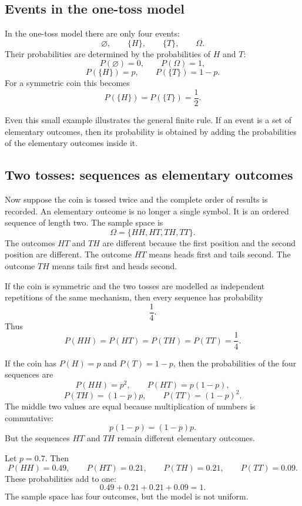 \subsection*{Events in the one-toss model}

In the one-toss model there are only four events:
\[
\varnothing,\qquad \{H\},\qquad \{T\},\qquad \Omega.
\]
Their probabilities are determined by the probabilities of \(H\) and \(T\):
\[
P(\varnothing)=0,\qquad P(\Omega)=1,
\]
\[
P(\{H\})=p,\qquad P(\{T\})=1-p.
\]
For a symmetric coin this becomes
\[
P(\{H\})=P(\{T\})=\frac12.
\]

Even this small example illustrates the general finite rule. If an event is a
set of elementary outcomes, then its probability is obtained by adding the
probabilities of the elementary outcomes inside it.

\subsection*{Two tosses: sequences as elementary outcomes}

Now suppose the coin is tossed twice and the complete order of results is
recorded. An elementary outcome is no longer a single symbol. It is an ordered
sequence of length two. The sample space is
\[
\Omega=\{HH,HT,TH,TT\}.
\]
The outcomes \(HT\) and \(TH\) are different because the first position and the
second position are different. The outcome \(HT\) means heads first and tails
second. The outcome \(TH\) means tails first and heads second.

If the coin is symmetric and the two tosses are modelled as independent
repetitions of the same mechanism, then every sequence has probability
\[
\frac14.
\]
Thus
\[
P(HH)=P(HT)=P(TH)=P(TT)=\frac14.
\]

If the coin has \(P(H)=p\) and \(P(T)=1-p\), then the probabilities of the four
sequences are
\[
P(HH)=p^2,\qquad P(HT)=p(1-p),
\]
\[
P(TH)=(1-p)p,\qquad P(TT)=(1-p)^2.
\]
The middle two values are equal because multiplication of numbers is
commutative:
\[
p(1-p)=(1-p)p.
\]
But the sequences \(HT\) and \(TH\) remain different elementary outcomes.

\begin{examplebox}
Let \(p=0.7\). Then
\[
P(HH)=0.49,\qquad P(HT)=0.21,\qquad P(TH)=0.21,\qquad P(TT)=0.09.
\]
These probabilities add to one:
\[
0.49+0.21+0.21+0.09=1.
\]
The sample space has four outcomes, but the model is not uniform.
\end{examplebox}

